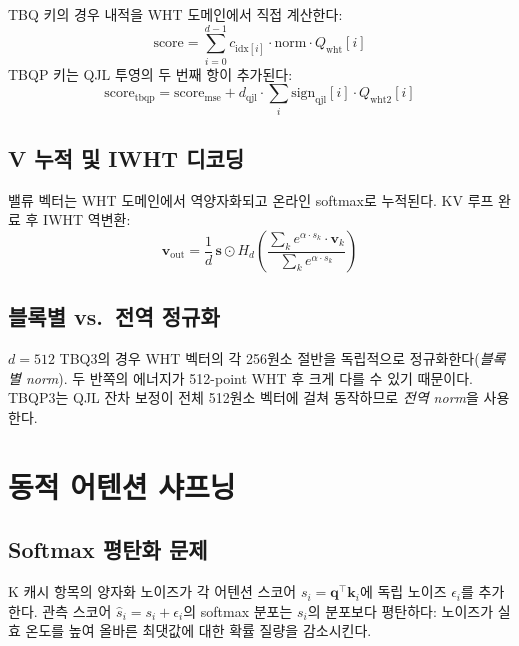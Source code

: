 \documentclass[10pt,twocolumn]{article}
\begin{document}
TBQ 키의 경우 내적을 WHT 도메인에서 직접 계산한다:
\begin{equation}
\text{score} = \sum_{i=0}^{d-1} c_{\text{idx}[i]} \cdot \text{norm} \cdot Q_{\text{wht}}[i]
\end{equation}
TBQP 키는 QJL 투영의 두 번째 항이 추가된다:
\begin{equation}
\text{score}_\text{tbqp} = \text{score}_\text{mse} + d_\text{qjl} \cdot \sum_{i} \text{sign}_\text{qjl}[i] \cdot Q_{\text{wht2}}[i]
\end{equation}

\subsection{V 누적 및 IWHT 디코딩}

밸류 벡터는 WHT 도메인에서 역양자화되고 온라인 softmax로 누적된다. KV 루프 완료 후 IWHT 역변환:
\begin{equation}
\mathbf{v}_\text{out} = \frac{1}{d}\,\mathbf{s} \odot H_d\!\left(\frac{\sum_k e^{\alpha \cdot s_k} \cdot \mathbf{v}_k}{\sum_k e^{\alpha \cdot s_k}}\right)
\end{equation}

\subsection{블록별 vs.\ 전역 정규화}

$d=512$ TBQ3의 경우 WHT 벡터의 각 256원소 절반을 독립적으로 정규화한다(\emph{블록별 norm}). 두 반쪽의 에너지가 512-point WHT 후 크게 다를 수 있기 때문이다. TBQP3는 QJL 잔차 보정이 전체 512원소 벡터에 걸쳐 동작하므로 \emph{전역 norm}을 사용한다.

\section{동적 어텐션 샤프닝}
\label{sec:sharpening}

\subsection{Softmax 평탄화 문제}

K 캐시 항목의 양자화 노이즈가 각 어텐션 스코어 $s_i = \mathbf{q}^\top \mathbf{k}_i$에 독립 노이즈 $\epsilon_i$를 추가한다. 관측 스코어 $\hat{s}_i = s_i + \epsilon_i$의 softmax 분포는 $s_i$의 분포보다 평탄하다: 노이즈가 실효 온도를 높여 올바른 최댓값에 대한 확률 질량을 감소시킨다.
\end{document}
